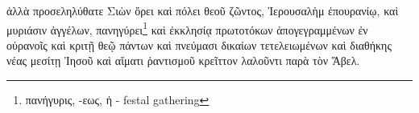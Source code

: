 




 ἀλλὰ προσεληλύθατε Σιὼν ὄρει καὶ πόλει θεοῦ ζῶντος, Ἰερουσαλὴμ ἐπουρανίῳ, καὶ μυριάσιν ἀγγέλων,
πανηγύρει\footnote{πανήγυρις, -εως, ἡ - festal gathering}
 καὶ ἐκκλησίᾳ πρωτοτόκων ἀπογεγραμμένων ἐν οὐρανοῖς καὶ κριτῇ θεῷ πάντων καὶ πνεύμασι δικαίων τετελειωμένων
 καὶ διαθήκης νέας μεσίτῃ Ἰησοῦ καὶ αἵματι ῥαντισμοῦ κρεῖττον λαλοῦντι παρὰ τὸν Ἅβελ.
